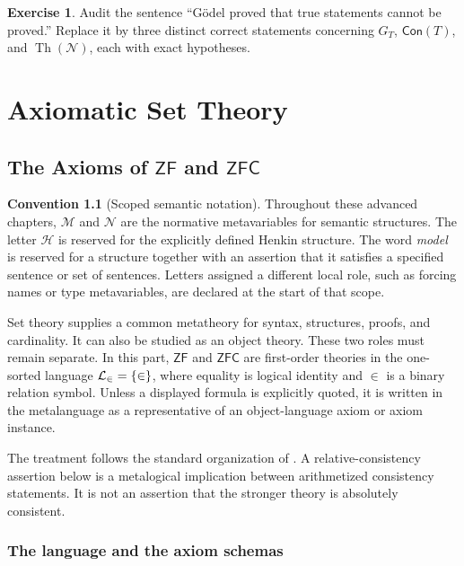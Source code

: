 \documentclass[11pt,oneside,openany]{book}
\theoremstyle{definition}
\newtheorem{exercise}[definition]{Exercise}
\newtheorem{convention}[definition]{Convention}
\theoremstyle{plain}
\theoremstyle{remark}
\DeclarePairedDelimiter{\set}{\lbrace}{\rbrace}
\newcommand{\Lang}{\mathcal{L}}
\newcommand{\Th}{\operatorname{Th}}
\newcommand{\ZF}{\mathsf{ZF}}
\newcommand{\ZFC}{\mathsf{ZFC}}
\begin{document}
\begin{exercise}
\label{ex:second-incompleteness-04}
Audit the sentence ``G\"odel proved that true statements cannot be proved.''
Replace it by three distinct correct statements concerning \(G_T\),
\(\mathsf{Con}(T)\), and \(\Th(\mathcal N)\), each with exact hypotheses.
\end{exercise}
\part{Axiomatic Set Theory}
\label{part:set-theory}

\chapter[The Axioms of ZF and ZFC]{The Axioms of \(\ZF\) and \(\ZFC\)}
\label{ch:zf-zfc}

\begin{convention}[Scoped semantic notation]
Throughout these advanced chapters, \(\mathcal M\) and \(\mathcal N\) are the
normative metavariables for semantic structures.  The letter \(\mathcal H\) is
reserved for the explicitly defined Henkin structure.  The word \emph{model}
is reserved for a structure together with an assertion that it satisfies a
specified sentence or set of sentences.  Letters assigned a different local
role, such as forcing names or type metavariables, are declared at the start of
that scope.
\end{convention}

Set theory supplies a common metatheory for syntax, structures, proofs, and
cardinality.  It can also be studied as an object theory.  These two roles must
remain separate.  In this part, \(\ZF\) and \(\ZFC\) are first-order theories in
the one-sorted language \(\Lang_{\in}=\set{\in}\), where equality is logical
identity and \(\in\) is a binary relation symbol.  Unless a displayed formula
is explicitly quoted, it is written in the metalanguage as a representative of
an object-language axiom or axiom instance.

The treatment follows the standard organization of \cite{Jech2003}.  A
relative-consistency assertion below is a metalogical implication between
arithmetized consistency statements.  It is not an assertion that the stronger
theory is absolutely consistent.

\section{The language and the axiom schemas}
\label{sec:zf-zfc-01}
\end{document}
